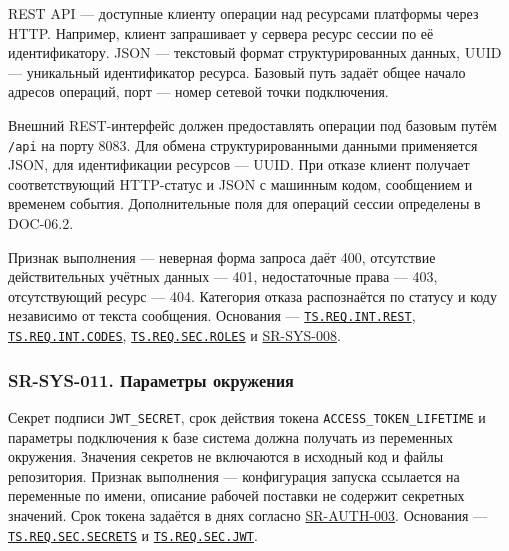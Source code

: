 \documentclass[12pt,a4paper]{article}
\begin{document}
\hypertarget{sr-sys-010-единый-внешний-интерфейс}{}

\hypertarget{sr-sys-010}{}

REST API --- доступные клиенту операции над ресурсами платформы через HTTP. Например, клиент запрашивает у сервера ресурс сессии по её идентификатору. JSON --- текстовый формат структурированных данных, UUID --- уникальный идентификатор ресурса. Базовый путь задаёт общее начало адресов операций, порт --- номер сетевой точки подключения.

Внешний REST-интерфейс должен предоставлять операции под базовым путём \texttt{/api} на порту 8083. Для обмена структурированными данными применяется JSON, для идентификации ресурсов --- UUID. При отказе клиент получает соответствующий HTTP-статус и JSON с машинным кодом, сообщением и временем события. Дополнительные поля для операций сессии определены в DOC-06.2.

Признак выполнения --- неверная форма запроса даёт 400, отсутствие действительных учётных данных --- 401, недостаточные права --- 403, отсутствующий ресурс --- 404. Категория отказа распознаётся по статусу и коду независимо от текста сообщения. Основания --- {\href{../02\_Техническое\_задание/DOC-02\_Техническое\_задание.pdf\#ts-req-int-rest}{\texttt{TS.\allowbreak{}REQ.\allowbreak{}INT.\allowbreak{}REST}}}, {\href{../02\_Техническое\_задание/DOC-02\_Техническое\_задание.pdf\#ts-req-int-codes}{\texttt{TS.\allowbreak{}REQ.\allowbreak{}INT.\allowbreak{}CODES}}}, {\href{../02\_Техническое\_задание/DOC-02\_Техническое\_задание.pdf\#ts-req-sec-roles}{\texttt{TS.\allowbreak{}REQ.\allowbreak{}SEC.\allowbreak{}ROLES}}} и {\hyperlink{sr-sys-008}{SR-SYS-008}}.

\subsubsection{SR-SYS-011. Параметры окружения}\label{sr-sys-011-ux43fux430ux440ux430ux43cux435ux442ux440ux44b-ux43eux43aux440ux443ux436ux435ux43dux438ux44f}

\hypertarget{sr-sys-011-параметры-окружения}{}

\hypertarget{sr-sys-011}{}

Секрет подписи \texttt{JWT\_SECRET}, срок действия токена \texttt{ACCESS\_\allowbreak{}TOKEN\_\allowbreak{}LIFETIME} и параметры подключения к базе система должна получать из переменных окружения. Значения секретов не включаются в исходный код и файлы репозитория. Признак выполнения --- конфигурация запуска ссылается на переменные по имени, описание рабочей поставки не содержит секретных значений. Срок токена задаётся в днях согласно {\hyperlink{sr-auth-003}{SR-AUTH-003}}. Основания --- {\href{../02\_Техническое\_задание/DOC-02\_Техническое\_задание.pdf\#ts-req-sec-secrets}{\texttt{TS.\allowbreak{}REQ.\allowbreak{}SEC.\allowbreak{}SECRETS}}} и {\href{../02\_Техническое\_задание/DOC-02\_Техническое\_задание.pdf\#ts-req-sec-jwt}{\texttt{TS.\allowbreak{}REQ.\allowbreak{}SEC.\allowbreak{}JWT}}}.
\end{document}
